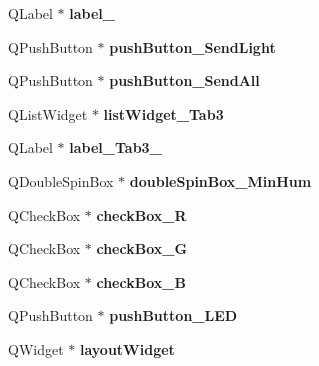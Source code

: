 \begin{DoxyCompactItemize}
\mbox{\label{classUi__MainWindow_ad6bab8fb8903b8f41afea1218ee52695}} 
Q\+Label $\ast$ {\bfseries label\+\_}
\item 
\mbox{\label{classUi__MainWindow_ab46b92618984b3101ef03a9dadae7904}} 
Q\+Push\+Button $\ast$ {\bfseries push\+Button\+\_\+\+Send\+Light}
\item 
\mbox{\label{classUi__MainWindow_a69db72f9e01c4959104297c76b2481a8}} 
Q\+Push\+Button $\ast$ {\bfseries push\+Button\+\_\+\+Send\+All}
\item 
\mbox{\label{classUi__MainWindow_aca60ec9dfd98db3b2fb421a7a6e698d9}} 
Q\+List\+Widget $\ast$ {\bfseries list\+Widget\+\_\+\+Tab3}
\item 
\mbox{\label{classUi__MainWindow_a942705f7d32336770f7842952f7ec9c8}} 
Q\+Label $\ast$ {\bfseries label\+\_\+\+Tab3\+\_}
\item 
\mbox{\label{classUi__MainWindow_a98bd5c224e3e27dd59f990fc0435f3e9}} 
Q\+Double\+Spin\+Box $\ast$ {\bfseries double\+Spin\+Box\+\_\+\+Min\+Hum}
\item 
\mbox{\label{classUi__MainWindow_a52bfd816314fbb7ee236f741060b8410}} 
Q\+Check\+Box $\ast$ {\bfseries check\+Box\+\_\+R}
\item 
\mbox{\label{classUi__MainWindow_a99eb0ee506bb84650ce684bbe1b75bc9}} 
Q\+Check\+Box $\ast$ {\bfseries check\+Box\+\_\+G}
\item 
\mbox{\label{classUi__MainWindow_a817ebe4fc9ee094eeca30bd77b328e0d}} 
Q\+Check\+Box $\ast$ {\bfseries check\+Box\+\_\+B}
\item 
\mbox{\label{classUi__MainWindow_a701a5d7b35a030445ee880d31559ef97}} 
Q\+Push\+Button $\ast$ {\bfseries push\+Button\+\_\+\+L\+ED}
\item 
\mbox{\label{classUi__MainWindow_ab96ab0f0578098521fa69a75aa5cdde8}} 
Q\+Widget $\ast$ {\bfseries layout\+Widget}
\item 

\end{DoxyCompactItemize}
